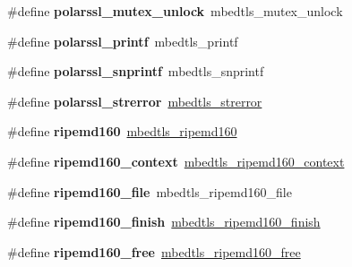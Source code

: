 \begin{DoxyCompactItemize}
\item 
\mbox{\label{compat-1_83_8h_a42557dfbaa55c9c67f3b1c70d9bbbcc4}} 
\#define {\bfseries polarssl\+\_\+mutex\+\_\+unlock}~mbedtls\+\_\+mutex\+\_\+unlock
\item 
\mbox{\label{compat-1_83_8h_afc6a7362c0f0c9cfa8fc76b3281e2b37}} 
\#define {\bfseries polarssl\+\_\+printf}~mbedtls\+\_\+printf
\item 
\mbox{\label{compat-1_83_8h_a325a816132b264186c711bf1d131987c}} 
\#define {\bfseries polarssl\+\_\+snprintf}~mbedtls\+\_\+snprintf
\item 
\mbox{\label{compat-1_83_8h_aaa94f3f8ce3b8c125b975e53cc1d7c9c}} 
\#define {\bfseries polarssl\+\_\+strerror}~\mbox{\hyperlink{error_8h_a8c41c149b77a4807115b19c2af858558}{mbedtls\+\_\+strerror}}
\item 
\mbox{\label{compat-1_83_8h_a53a397703a6eca99f8eaf7916e7185ad}} 
\#define {\bfseries ripemd160}~\mbox{\hyperlink{ripemd160_8h_add0b65389ff09a48612b659af67f5667}{mbedtls\+\_\+ripemd160}}
\item 
\mbox{\label{compat-1_83_8h_abe295be2014caf44684698bd38424a44}} 
\#define {\bfseries ripemd160\+\_\+context}~\mbox{\hyperlink{structmbedtls__ripemd160__context}{mbedtls\+\_\+ripemd160\+\_\+context}}
\item 
\mbox{\label{compat-1_83_8h_a7d188a577c95e84f157eafe5b8c1e127}} 
\#define {\bfseries ripemd160\+\_\+file}~mbedtls\+\_\+ripemd160\+\_\+file
\item 
\mbox{\label{compat-1_83_8h_a73fae472a1d8263b064496af584c0251}} 
\#define {\bfseries ripemd160\+\_\+finish}~\mbox{\hyperlink{ripemd160_8h_a816028be7aabafbf2386b2d967e8a801}{mbedtls\+\_\+ripemd160\+\_\+finish}}
\item 
\mbox{\label{compat-1_83_8h_aabb700ef92890485de752f28550b2454}} 
\#define {\bfseries ripemd160\+\_\+free}~\mbox{\hyperlink{ripemd160_8h_a8b7b57650be232cb05ae37bc859332d1}{mbedtls\+\_\+ripemd160\+\_\+free}}
\item 
\mbox{\label{compat-1_83_8h_a6a108796dfaad1036ae122eac6e3b7fb}} 

\end{DoxyCompactItemize}
